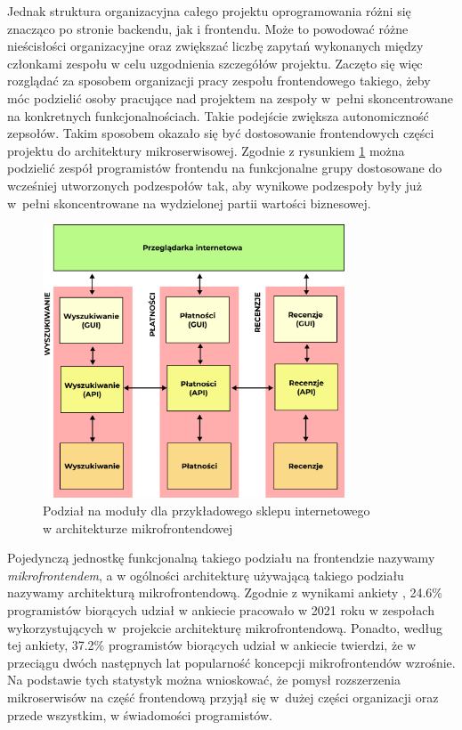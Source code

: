 \documentclass{SGGW-thesis}
\begin{document}
{Jednak struktura organizacyjna całego projektu oprogramowania różni się znacząco po stronie backendu, jak i frontendu. Może to powodować różne nieścisłości organizacyjne oraz zwiększać liczbę zapytań wykonanych między członkami zespołu w celu uzgodnienia szczegółów projektu. Zaczęto się więc rozglądać za sposobem organizacji pracy zespołu frontendowego takiego, żeby móc podzielić osoby pracujące nad projektem na zespoły w~pełni skoncentrowane na konkretnych funkcjonalnościach. Takie podejście zwiększa autonomiczność zepsołów.
Takim sposobem okazało się być dostosowanie frontendowych części projektu do architektury mikroserwisowej. Zgodnie z rysunkiem \cref{fig:microfrontends_diagram} można podzielić zespół programistów frontendu na funkcjonalne grupy dostosowane do wcześniej utworzonych podzespołów tak, aby wynikowe podzespoły były już w~pełni skoncentrowane na wydzielonej partii wartości biznesowej.

\begin{figure}[h]
	\centering
	\captionsetup{justification=centering}
	\includegraphics[width=0.8\textwidth]{microfrontends_diagram.png}
	\caption{Podział na moduły dla przykładowego sklepu internetowego \\ w architekturze mikrofrontendowej}
	\label{fig:microfrontends_diagram}
\end{figure}

Pojedynczą jednostkę funkcjonalną takiego podziału na frontendzie nazywamy \textit{mikrofrontendem}, a w ogólności architekturę używającą takiego podziału nazywamy architekturą mikrofrontendową.
Zgodnie z wynikami ankiety \cite{tsh_2022}, 24.6\% programistów biorących udział w ankiecie pracowało w 2021 roku w zespołach wykorzystujących w~projekcie architekturę mikrofrontendową. Ponadto, według tej ankiety, 37.2\% programistów biorących udział w ankiecie twierdzi, że w przeciągu dwóch następnych lat popularność koncepcji mikrofrontendów wzrośnie. Na podstawie tych statystyk można wnioskować, że pomysł rozszerzenia mikroserwisów na część frontendową przyjął się w~dużej części organizacji oraz przede wszystkim, w świadomości programistów.

}
\end{document}
